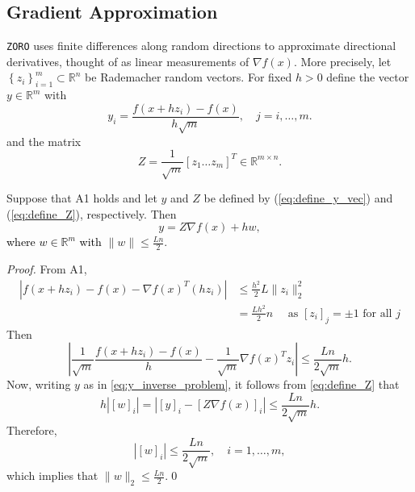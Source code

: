 \subsection{Gradient Approximation}
{\tt ZORO} \cite{cai2022zeroth} uses finite differences along random directions to approximate directional derivatives, thought of as linear measurements of $\nabla f(x)$. More precisely, let $\left\{z_{i}\right\}_{i=1}^{m}\subset\mathbb{R}^{n}$ be Rademacher random vectors. For fixed $h > 0$ define the vector $y\in\mathbb{R}^{m}$ with 
\begin{equation}
y_{i}=\dfrac{f(x+h z_{i})-f(x)}{h\sqrt{m}},\quad j=i,\ldots,m.
\label{eq:define_y_vec}
\end{equation}
and the matrix 
\begin{equation}
Z=\dfrac{1}{\sqrt{m}}\left[z_{1}\ldots z_{m}\right]^{T}\in\mathbb{R}^{m\times n}.
\label{eq:define_Z}
\end{equation}


\begin{lemma}
\label{lem:y_error}
Suppose that A1 holds and let $y$ and $Z$ be defined by (\ref{eq:define_y_vec}) and (\ref{eq:define_Z}), respectively. Then
\begin{equation}
y=Z\nabla f(x)+h w,
\label{eq:y_inverse_problem}
\end{equation}
\textcolor{black}{where $w\in\mathbb{R}^{m}$ with} $\|w\|\leq\frac{Ln}{2}$.
\end{lemma}

\begin{proof}
From A1,
\begin{align*}
    \left|f(x+h z_{i})-f(x)-\nabla f(x)^{T}(h z_{i})\right| &\leq \frac{h^2}{2}L\|z_i\|_2^2 \\
    & = \frac{Lh^2}{2}n \quad \text{ as $[z_i]_j = \pm 1$ for all $j$}
\end{align*}
Then
\begin{equation*}
\left|\frac{1}{\sqrt{m}}\dfrac{f(x+h z_{i})-f(x)}{h}-\frac{1}{\sqrt{m}}\nabla f(x)^{T}z_{i}\right|\leq\frac{Ln}{2\sqrt{m}}h.
\end{equation*}
Now, writing $y$ as in \eqref{eq:y_inverse_problem}, it follows from \eqref{eq:define_Z} that
\begin{equation*}
h |\left[w\right]_{i}|=|\left[y\right]_{i}-\left[Z\nabla f(x)\right]_{i}|\leq\frac{Ln}{2\sqrt{m}}h.
\end{equation*}
Therefore, 
\begin{equation*}
|\left[w\right]_{i}|\leq\dfrac{Ln}{2\sqrt{m}},\quad i=1,\ldots,m,
\end{equation*}
which implies that $\|w\|_{2}\leq\frac{Ln}{2}$.\qed
\end{proof}

